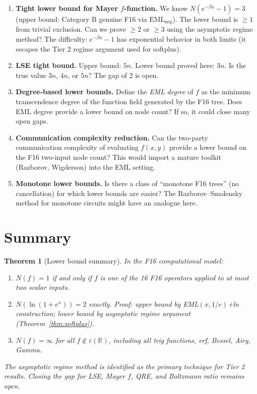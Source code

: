 \documentclass[11pt]{article}
\newtheorem{theorem}{Theorem}
\begin{document}
\begin{enumerate}

  \item \textbf{Tight lower bound for Mayer $f$-function.}
    We know $N(e^{-\beta u} - 1) = 3$ (upper bound: Category B genuine F16 via
    $\mathrm{EML}_{\mathrm{neg}}$). The lower bound is $\geq 1$ from trivial exclusion.
    Can we prove $\geq 2$ or $\geq 3$ using the asymptotic regime method?
    The difficulty: $e^{-\beta u} - 1$ has exponential behavior in both limits
    (it escapes the Tier 2 regime argument used for softplus).

  \item \textbf{LSE tight bound.}
    Upper bound: $5n$. Lower bound proved here: $3n$. Is the true value $3n$, $4n$, or $5n$?
    The gap of 2 is open.

  \item \textbf{Degree-based lower bounds.}
    Define the \emph{EML degree} of $f$ as the minimum transcendence degree of the
    function field generated by the F16 tree. Does EML degree provide a lower bound
    on node count? If so, it could close many open gaps.

  \item \textbf{Communication complexity reduction.}
    Can the two-party communication complexity of evaluating $f(x,y)$ provide
    a lower bound on the F16 two-input node count?
    This would import a mature toolkit (Razborov, Wigderson) into the EML setting.

  \item \textbf{Monotone lower bounds.}
    Is there a class of ``monotone F16 trees'' (no cancellation) for which
    lower bounds are easier? The Razborov--Smolensky method for monotone circuits
    might have an analogue here.

\end{enumerate}

\section{Summary}

\begin{theorem}[Lower bound summary]
In the F16 computational model:
\begin{enumerate}
  \item[(T1)] $N(f) = 1$ if and only if $f$ is one of the 16 F16 operators
    applied to at most two scalar inputs.
  \item[(T2)] $N(\ln(1+e^x)) = 2$ exactly.
    Proof: upper bound by EML$(x,1/e)$+ln construction; lower bound by asymptotic
    regime argument (Theorem~\ref{thm:softplus}).
  \item[(T3)] $N(f) = \infty$ for all $f \notin \varepsilon(\mathbb{R})$,
    including all trig functions, erf, Bessel, Airy, Gamma.
\end{enumerate}
The asymptotic regime method is identified as the primary technique for Tier 2 results.
Closing the gap for LSE, Mayer $f$, QRE, and Boltzmann ratio remains open.
\end{theorem}
\end{document}
